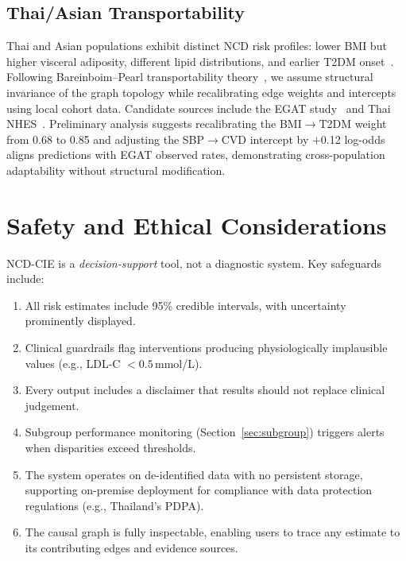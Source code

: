 \documentclass[runningheads]{llncs}
\begin{document}
\subsection{Thai/Asian Transportability}\label{sec:thai}

Thai and Asian populations exhibit distinct NCD risk profiles: lower
BMI but higher visceral adiposity, different lipid distributions, and
earlier T2DM onset~\cite{aekplakorn2011thai}.  Following
Bareinboim--Pearl transportability
theory~\cite{bareinboim2016causal}, we assume structural invariance
of the graph topology while recalibrating edge weights and intercepts
using local cohort data.  Candidate sources include the EGAT
study~\cite{sritara2003egat} and Thai NHES~\cite{aekplakorn2011thai}.
Preliminary analysis suggests recalibrating the BMI$\rightarrow$T2DM
weight from 0.68 to 0.85 and adjusting the SBP$\rightarrow$CVD
intercept by $+$0.12 log-odds aligns predictions with EGAT observed
rates, demonstrating cross-population adaptability without structural
modification.

\section{Safety and Ethical Considerations}\label{sec:ethics}

NCD-CIE is a \emph{decision-support} tool, not a diagnostic system.
Key safeguards include:
\begin{enumerate}
\item All risk estimates include 95\% credible intervals, with
  uncertainty prominently displayed.
\item Clinical guardrails flag interventions producing physiologically
  implausible values (e.g., LDL-C $< 0.5$\,mmol/L).
\item Every output includes a disclaimer that results should not
  replace clinical judgement.
\item Subgroup performance monitoring (Section~\ref{sec:subgroup})
  triggers alerts when disparities exceed thresholds.
\item The system operates on de-identified data with no persistent
  storage, supporting on-premise deployment for compliance with data
  protection regulations (e.g., Thailand's PDPA).
\item The causal graph is fully inspectable, enabling users to trace
  any estimate to its contributing edges and evidence sources.
\end{enumerate}
\end{document}
